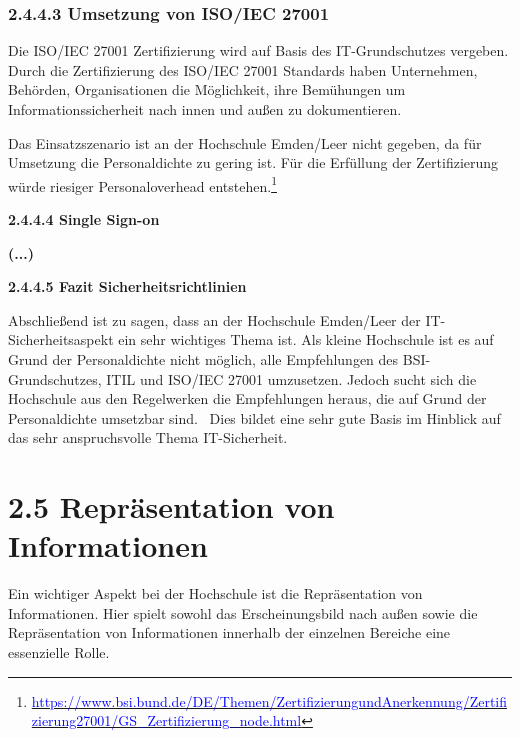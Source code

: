 \documentclass[a4paper]{article}
\newcommand\textstyleAbsatzStandardschriftart[1]{#1}
\newcommand\textstyleHyperlink[1]{\textcolor{blue}{#1}}
\begin{document}
\subsubsection[2.4.4.3 Umsetzung von ISO/IEC 27001]{\textstyleAbsatzStandardschriftart{2.4.4.3 Umsetzung von ISO/IEC
27001}}
{\sffamily\mdseries\color{black}
Die ISO/IEC 27001 Zertifizierung wird auf Basis des IT-Grundschutzes vergeben. Durch die Zertifizierung des ISO/IEC
27001 Standards haben Unternehmen, Behörden, Organisationen die Möglichkeit, ihre Bemühungen um Informationssicherheit
nach innen und außen zu dokumentieren.}


\bigskip

{\sffamily\mdseries\color{black}
Das Einsatzszenario ist an der Hochschule Emden/Leer nicht gegeben, da für Umsetzung die Personaldichte zu gering ist.
Für die Erfüllung der Zertifizierung würde riesiger Personaloverhead
entstehen.\footnote{\href{https://www.bsi.bund.de/DE/Themen/ZertifizierungundAnerkennung/Zertifizierung27001/GS_Zertifizierung_node.html}{\textstyleHyperlink{https://www.bsi.bund.de/DE/Themen/ZertifizierungundAnerkennung/Zertifizierung27001/GS\_Zertifizierung\_node.htm}}\href{https://www.bsi.bund.de/DE/Themen/ZertifizierungundAnerkennung/Zertifizierung27001/GS_Zertifizierung_node.html}{\textstyleHyperlink{l}}}}


\bigskip

{\sffamily\bfseries\color{black}
2.4.4.4 Single Sign-on}

{\sffamily\bfseries\color{black}
(...)}

{\sffamily\bfseries\color{black}
2.4.4.5 Fazit Sicherheitsrichtlinien}

{\sffamily\mdseries\color{black}
\textstyleAbsatzStandardschriftart{Abschließend ist zu sagen, dass an der Hochschule Emden/Leer der IT-Sicherheitsaspekt
ein sehr wichtiges Thema ist. Als kleine Hochschule ist es auf Grund der Personaldichte nicht möglich, alle
Empfehlungen des BSI-Grundschutzes, ITIL und ISO/IEC 27001 umzusetzen. Jedoch sucht sich die Hochschule aus den
Regelwerken die Empfehlungen heraus, die auf Grund der Personaldichte umsetzbar sind. \ Dies bildet eine sehr gute
Basis im Hinblick auf das sehr anspruchsvolle Thema IT-Sicherheit.}}

\section{2.5 Repräsentation von Informationen}
{\sffamily\mdseries\color{black}
Ein wichtiger Aspekt bei der Hochschule ist die Repräsentation von Informationen. Hier spielt sowohl das
Erscheinungsbild nach außen sowie die Repräsentation von Informationen innerhalb der einzelnen Bereiche eine
essenzielle Rolle. }
\end{document}
